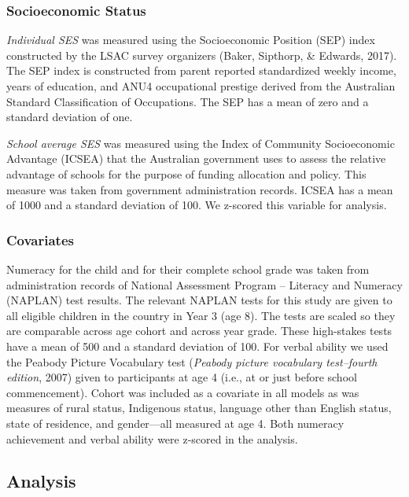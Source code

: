 \documentclass[
  english,
  man]{apa6}
\begin{document}
\hypertarget{socioeconomic-status}{%
\subsubsection{Socioeconomic Status}\label{socioeconomic-status}}

\emph{Individual SES} was measured using the Socioeconomic Position (SEP) index constructed by the LSAC survey organizers (Baker, Sipthorp, \& Edwards, 2017). The SEP index is constructed from parent reported standardized weekly income, years of education, and ANU4 occupational prestige derived from the Australian Standard Classification of Occupations. The SEP has a mean of zero and a standard deviation of one.

\emph{School average SES} was measured using the Index of Community Socioeconomic Advantage (ICSEA) that the Australian government uses to assess the relative advantage of schools for the purpose of funding allocation and policy. This measure was taken from government administration records. ICSEA has a mean of 1000 and a standard deviation of 100. We z-scored this variable for analysis.

\hypertarget{covariates}{%
\subsubsection{Covariates}\label{covariates}}

Numeracy for the child and for their complete school grade was taken from administration records of National Assessment Program -- Literacy and Numeracy (NAPLAN) test results. The relevant NAPLAN tests for this study are given to all eligible children in the country in Year 3 (age 8). The tests are scaled so they are comparable across age cohort and across year grade. These high-stakes tests have a mean of 500 and a standard deviation of 100. For verbal ability we used the Peabody Picture Vocabulary test (\emph{Peabody picture vocabulary test--fourth edition}, 2007) given to participants at age 4 (i.e., at or just before school commencement). Cohort was included as a covariate in all models as was measures of rural status, Indigenous status, language other than English status, state of residence, and gender---all measured at age 4. Both numeracy achievement and verbal ability were z-scored in the analysis.

\hypertarget{analysis}{%
\subsection{Analysis}\label{analysis}}
\end{document}

